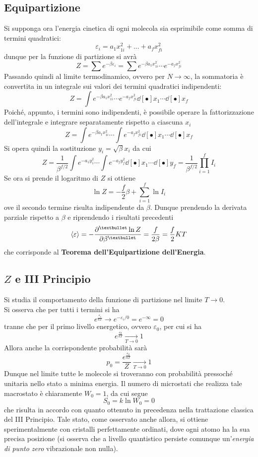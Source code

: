 \documentclass[10pt, oneside]{book}
\newcommand{\mean}[1]{\langle #1 \rangle}
\newcommand{\ds}{\displaystyle}
\newcommand{\tendsto}[2]{\xrightarrow[#1 \rightarrow #2]{}}
\begin{document}
\subsection{Equipartizione}
Si supponga ora l'energia cinetica di ogni molecola sia esprimibile come somma di termini quadratici:
\[\varepsilon_i = a_1 x_{1i}^2 + ... + a_f x_{fi}^2\]
dunque per la funzione di partizione si avrà
\[Z = \sum e^{- \beta \varepsilon_i} = \sum e^{- \beta a_1 x_{1i}^2} \cdots e^{ - a_f x_{fi}^2}\]
Passando quindi al limite termodinamico, ovvero per $N \rightarrow \infty$, la sommatoria è convertita in un integrale sui valori dei termini quadratici indipendenti:
\[Z = \int e^{- \beta a_1 x_{1i}^2} \cdots e^{ - a_f x_{fi}^2} \dd[•]{x_1} \cdots \dd[•]{x_f} \]
Poiché, appunto, i termini sono indipendenti, è possibile operare la fattorizzazione dell'integrale e integrare separatamente rispetto a ciascuna $x_i$
\[Z = \int e^{- \beta a_1 x_{1i}^2} \cdots \int e^{ - a_f x_{fi}^2} \dd[•]{x_1} \cdots \dd[•]{x_f}\]
Si opera quindi la sostituzione $\ds y_i = \sqrt{\beta} x_i$ da cui
\[Z = \frac{1}{\beta^{f/2}} \int e^{- a_1 y_1^2} \cdots \int e^{ - a_f y_f^2} \dd[•]{x_1} \cdots \dd[•]{y_f} = \frac{1}{\beta^{f/2}} \prod_{i=1}^f I_i\]
Se ora si prende il logaritmo di $Z$ si ottiene
\[\ln Z = - \frac{f}{2} \beta + \sum_{i=1}^f \ln I_i\]
ove il secondo termine risulta indipendente da $\beta$. Dunque prendendo la derivata parziale rispetto a $\beta$ e riprendendo i risultati precedenti
\[\mean{\varepsilon} = - \pdv[•]{\ln Z}{\beta}= \frac{f}{2 \beta} = \frac{f}{2}KT\]
che corrisponde al \textbf{Teorema dell'Equipartizione dell'Energia}.

\subsection{$Z$ e III Principio}
Si studia il comportamento della funzione di partizione nel limite $T \rightarrow 0$.\\
Si osserva che per tutti i termini si ha
\[e^{\frac{\varepsilon_i}{kT}} \longrightarrow e^{-\varepsilon_i/0} = e^{- \infty} = 0\]
tranne che per il primo livello energetico, ovvero $\varepsilon_0$, per cui si ha
\[e^{\frac{\varepsilon_0}{kT}} \tendsto{T}{0} 1\]
Allora anche la corrispondente probabilità sarà
\[p_0 = \frac{e^{\frac{\varepsilon_0}{kT}}}{Z}\tendsto{T}{0} 1\]
Dunque nel limite tutte le molecole si troveranno con probabilità pressoché unitaria nello stato a minima energia. Il numero di microstati che realizza tale macrostato è chiaramente $W_0 = 1$, da cui segue
\[S_0 = k \ln W_0 = 0\]
che risulta in accordo con quanto ottenuto in precedenza nella trattazione classica del III Principio. Tale stato, come osservato anche allora, si ottiene sperimentalmente con cristalli perfettamente ordinati, dove ogni atomo ha la sua precisa posizione (si osserva che a livello quantistico persiste comunque un'\textit{energia di punto zero} vibrazionale non nulla).
\end{document}

